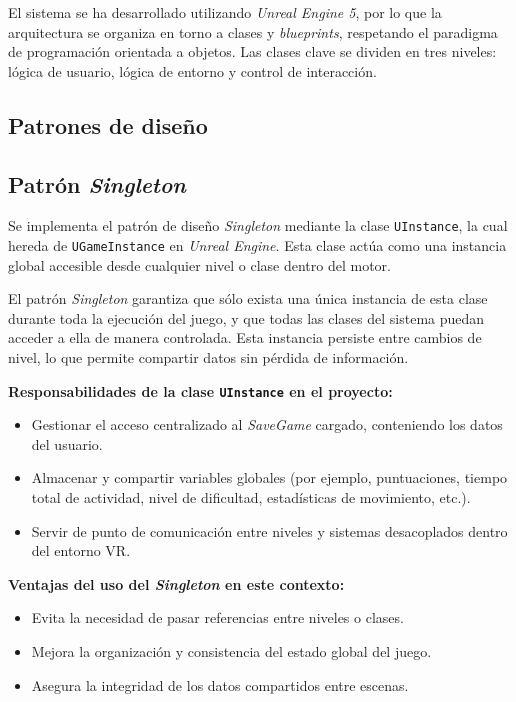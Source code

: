 El sistema se ha desarrollado utilizando \textit{Unreal Engine 5}, por lo que la arquitectura se organiza en torno a clases y \textit{blueprints}, respetando el paradigma de programación orientada a objetos. Las clases clave se dividen en tres niveles: lógica de usuario, lógica de entorno y control de interacción.

\subsection {Patrones de diseño}

\subsection{Patrón \textit{Singleton}}

Se implementa el patrón de diseño \textit{Singleton} mediante la clase \texttt{UInstance}, la cual hereda de \texttt{UGameInstance} en \textit{Unreal Engine}. Esta clase actúa como una instancia global accesible desde cualquier nivel o clase dentro del motor.

El patrón \textit{Singleton} garantiza que sólo exista una única instancia de esta clase durante toda la ejecución del juego, y que todas las clases del sistema puedan acceder a ella de manera controlada. Esta instancia persiste entre cambios de nivel, lo que permite compartir datos sin pérdida de información.


\textbf{Responsabilidades de la clase \texttt{UInstance} en el proyecto:}
\begin{itemize}
    \item Gestionar el acceso centralizado al \textit{SaveGame} cargado, conteniendo los datos del usuario.
    \item Almacenar y compartir variables globales (por ejemplo, puntuaciones, tiempo total de actividad, nivel de dificultad, estadísticas de movimiento, etc.).
    \item Servir de punto de comunicación entre niveles y sistemas desacoplados dentro del entorno VR.
\end{itemize}

\textbf{Ventajas del uso del \textit{Singleton} en este contexto:}
\begin{itemize}
    \item Evita la necesidad de pasar referencias entre niveles o clases.
    \item Mejora la organización y consistencia del estado global del juego.
    \item Asegura la integridad de los datos compartidos entre escenas.
\end{itemize}

